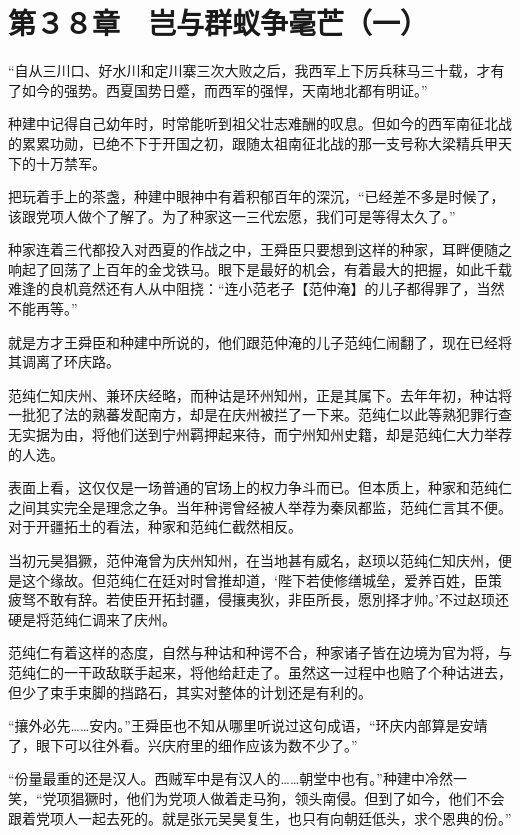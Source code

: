 \section{第３８章　岂与群蚁争毫芒（一）}

“自从三川口、好水川和定川寨三次大败之后，我西军上下厉兵秣马三十载，才有了如今的强势。西夏国势日蹙，而西军的强悍，天南地北都有明证。”

种建中记得自己幼年时，时常能听到祖父壮志难酬的叹息。但如今的西军南征北战的累累功勋，已绝不下于开国之初，跟随太祖南征北战的那一支号称大梁精兵甲天下的十万禁军。

把玩着手上的茶盏，种建中眼神中有着积郁百年的深沉，“已经差不多是时候了，该跟党项人做个了解了。为了种家这一三代宏愿，我们可是等得太久了。”

种家连着三代都投入对西夏的作战之中，王舜臣只要想到这样的种家，耳畔便随之响起了回荡了上百年的金戈铁马。眼下是最好的机会，有着最大的把握，如此千载难逢的良机竟然还有人从中阻挠：“连小范老子【范仲淹】的儿子都得罪了，当然不能再等。”

就是方才王舜臣和种建中所说的，他们跟范仲淹的儿子范纯仁闹翻了，现在已经将其调离了环庆路。

范纯仁知庆州、兼环庆经略，而种诂是环州知州，正是其属下。去年年初，种诂将一批犯了法的熟蕃发配南方，却是在庆州被拦了一下来。范纯仁以此等熟犯罪行查无实据为由，将他们送到宁州羁押起来待，而宁州知州史籍，却是范纯仁大力举荐的人选。

表面上看，这仅仅是一场普通的官场上的权力争斗而已。但本质上，种家和范纯仁之间其实完全是理念之争。当年种谔曾经被人举荐为秦凤都监，范纯仁言其不便。对于开疆拓土的看法，种家和范纯仁截然相反。

当初元昊猖獗，范仲淹曾为庆州知州，在当地甚有威名，赵顼以范纯仁知庆州，便是这个缘故。但范纯仁在廷对时曾推却道，‘陛下若使修缮城垒，爱养百姓，臣策疲驽不敢有辞。若使臣开拓封疆，侵攘夷狄，非臣所長，愿別择才帅。’不过赵顼还硬是将范纯仁调来了庆州。

范纯仁有着这样的态度，自然与种诂和种谔不合，种家诸子皆在边境为官为将，与范纯仁的一干政敌联手起来，将他给赶走了。虽然这一过程中也赔了个种诂进去，但少了束手束脚的挡路石，其实对整体的计划还是有利的。

“攘外必先……安内。”王舜臣也不知从哪里听说过这句成语，“环庆内部算是安靖了，眼下可以往外看。兴庆府里的细作应该为数不少了。”

“份量最重的还是汉人。西贼军中是有汉人的……朝堂中也有。”种建中冷然一笑，“党项猖獗时，他们为党项人做着走马狗，领头南侵。但到了如今，他们不会跟着党项人一起去死的。就是张元吴昊复生，也只有向朝廷低头，求个恩典的份。”

